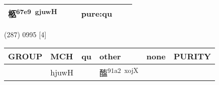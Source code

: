 \documentclass[14pt,a4paper]{scrartcl}
\begin{document}
\begin{longtable}[c]{@{}llllll@{}}
\begin{minipage}[t]{0.14\columnwidth}\raggedright\strut
柩\textsuperscript{67e9~gjuwH}
\strut\end{minipage} &
\begin{minipage}[t]{0.14\columnwidth}\raggedright\strut
\strut\end{minipage} &
\begin{minipage}[t]{0.14\columnwidth}\raggedright\strut
\strut\end{minipage} &
\begin{minipage}[t]{0.14\columnwidth}\raggedright\strut
pure:qu
\strut\end{minipage}\tabularnewline
\bottomrule
\end{longtable}

(287) 0995 {[}4{]}

\begin{longtable}[c]{@{}llllll@{}}
\toprule
\begin{minipage}[b]{0.14\columnwidth}\raggedright\strut
GROUP
\strut\end{minipage} &
\begin{minipage}[b]{0.14\columnwidth}\raggedright\strut
MCH
\strut\end{minipage} &
\begin{minipage}[b]{0.14\columnwidth}\raggedright\strut
qu
\strut\end{minipage} &
\begin{minipage}[b]{0.14\columnwidth}\raggedright\strut
other
\strut\end{minipage} &
\begin{minipage}[b]{0.14\columnwidth}\raggedright\strut
none
\strut\end{minipage} &
\begin{minipage}[b]{0.14\columnwidth}\raggedright\strut
PURITY
\strut\end{minipage}\tabularnewline
\midrule
\endhead
\begin{minipage}[t]{0.14\columnwidth}\raggedright\strut
𥁓
\strut\end{minipage} &
\begin{minipage}[t]{0.14\columnwidth}\raggedright\strut
hjuwH
\strut\end{minipage} &
\begin{minipage}[t]{0.14\columnwidth}\raggedright\strut
\strut\end{minipage} &
\begin{minipage}[t]{0.14\columnwidth}\raggedright\strut
醢\textsuperscript{91a2~xojX}
\strut\end{minipage} &

\end{longtable}
\end{document}
